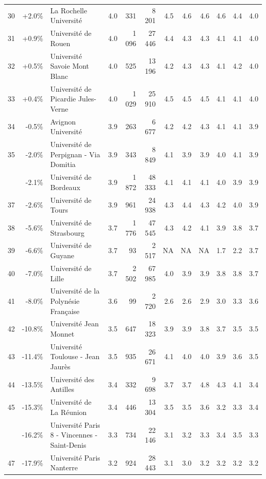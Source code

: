 \documentclass[11pt,french,landscape]{article}
\begin{document}
\begin{longtable}{rrlrrrrrrlrr}
30 & +2.0\% & La Rochelle Université & 4.0 & 331 & 8 201 & 4.5 & 4.6 & 4.6 & 4.6 & 4.4 & 4.0\\
\addlinespace
\rowcolor{gray!6}  31 & +0.9\% & Université de Rouen & 4.0 & 1 096 & 27 446 & 4.4 & 4.3 & 4.3 & 4.1 & 4.1 & 4.0\\
32 & +0.5\% & Université Savoie Mont Blanc & 4.0 & 525 & 13 196 & 4.2 & 4.3 & 4.3 & 4.1 & 4.2 & 4.0\\
\rowcolor{gray!6}  33 & +0.4\% & Université de Picardie Jules-Verne & 4.0 & 1 029 & 25 910 & 4.5 & 4.5 & 4.5 & 4.1 & 4.1 & 4.0\\
34 & -0.5\% & Avignon Université & 3.9 & 263 & 6 677 & 4.2 & 4.2 & 4.3 & 4.1 & 4.1 & 3.9\\
\rowcolor{gray!6}  35 & -2.0\% & Université de Perpignan - Via Domitia & 3.9 & 343 & 8 849 & 4.1 & 3.9 & 3.9 & 4.0 & 4.1 & 3.9\\
\addlinespace
36 & -2.1\% & Université de Bordeaux & 3.9 & 1 872 & 48 333 & 4.1 & 4.1 & 4.1 & 4.0 & 3.9 & 3.9\\
\rowcolor{gray!6}  37 & -2.6\% & Université de Tours & 3.9 & 961 & 24 938 & 4.3 & 4.4 & 4.3 & 4.2 & 4.0 & 3.9\\
38 & -5.6\% & Université de Strasbourg & 3.7 & 1 776 & 47 545 & 4.3 & 4.2 & 4.1 & 3.9 & 3.8 & 3.7\\
\rowcolor{gray!6}  39 & -6.6\% & Université de Guyane & 3.7 & 93 & 2 517 & NA & NA & NA & 1.7 & 2.2 & 3.7\\
40 & -7.0\% & Université de Lille & 3.7 & 2 502 & 67 985 & 4.0 & 3.9 & 3.9 & 3.8 & 3.8 & 3.7\\
\addlinespace
\rowcolor{gray!6}  41 & -8.0\% & Université de la Polynésie Française & 3.6 & 99 & 2 720 & 2.6 & 2.6 & 2.9 & 3.0 & 3.3 & 3.6\\
42 & -10.8\% & Université Jean Monnet & 3.5 & 647 & 18 323 & 3.9 & 3.9 & 3.8 & 3.7 & 3.5 & 3.5\\
\rowcolor{gray!6}  43 & -11.4\% & Université Toulouse - Jean Jaurès & 3.5 & 935 & 26 671 & 4.1 & 4.0 & 4.0 & 3.9 & 3.6 & 3.5\\
44 & -13.5\% & Université des Antilles & 3.4 & 332 & 9 698 & 3.7 & 3.7 & 4.8 & 4.3 & 4.1 & 3.4\\
\rowcolor{gray!6}  45 & -15.3\% & Université de La Réunion & 3.4 & 446 & 13 304 & 3.5 & 3.5 & 3.6 & 3.2 & 3.3 & 3.4\\
\addlinespace
46 & -16.2\% & Université Paris 8 - Vincennes - Saint-Denis & 3.3 & 734 & 22 146 & 3.1 & 3.2 & 3.3 & 3.4 & 3.5 & 3.3\\
\rowcolor{gray!6}  47 & -17.9\% & Université Paris Nanterre & 3.2 & 924 & 28 443 & 3.1 & 3.0 & 3.2 & 3.2 & 3.2 & 3.2\\

\end{longtable}
\end{document}
